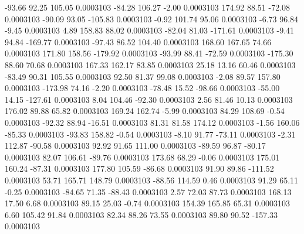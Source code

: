       -93.66       92.25      105.05     0.0003103
      -84.28      106.27       -2.00     0.0003103
      174.92       88.51      -72.08     0.0003103
      -90.09       93.05     -105.83     0.0003103
       -0.92      101.74       95.06     0.0003103
       -6.73       96.84       -9.45     0.0003103
        4.89      158.83       88.02     0.0003103
      -82.04       81.03     -171.61     0.0003103
       -9.41       94.84     -169.77     0.0003103
      -97.43       86.52      104.40     0.0003103
      168.60      167.65       74.66     0.0003103
      171.80      158.56     -179.92     0.0003103
      -93.99       88.41      -72.59     0.0003103
     -175.30       88.60       70.68     0.0003103
      167.33      162.17       83.85     0.0003103
       25.18       13.16       60.46     0.0003103
      -83.49       90.31      105.55     0.0003103
       92.50       81.37       99.08     0.0003103
       -2.08       89.57      157.80     0.0003103
     -173.98       74.16       -2.20     0.0003103
      -78.48       15.52      -98.66     0.0003103
      -55.00       14.15     -127.61     0.0003103
        8.04      104.46      -92.30     0.0003103
        2.56       81.46       10.13     0.0003103
      176.02       89.88       65.82     0.0003103
      169.24      162.74       -5.99     0.0003103
       84.29      108.69       -0.54     0.0003103
      -92.32       88.94      -16.51     0.0003103
       81.31       81.58      174.12     0.0003103
       -1.56      160.06      -85.33     0.0003103
      -93.83      158.82       -0.54     0.0003103
       -8.10       91.77      -73.11     0.0003103
       -2.31      112.87      -90.58     0.0003103
       92.92       91.65      111.00     0.0003103
      -89.59       96.87      -80.17     0.0003103
       82.07      106.61      -89.76     0.0003103
      173.68       68.29       -0.06     0.0003103
      175.01      160.24      -87.31     0.0003103
      177.80      105.59      -86.68     0.0003103
       91.90       89.86     -111.52     0.0003103
       53.71      165.71      148.79     0.0003103
      -88.56      114.59        0.46     0.0003103
       91.29       65.11       -0.25     0.0003103
      -84.65       71.35      -88.43     0.0003103
        2.57       72.03       87.73     0.0003103
      168.13       17.50        6.68     0.0003103
       89.15       25.03       -0.74     0.0003103
      154.39      165.85       65.31     0.0003103
        6.60      105.42       91.84     0.0003103
       82.34       88.26       73.55     0.0003103
       89.80       90.52     -157.33     0.0003103
